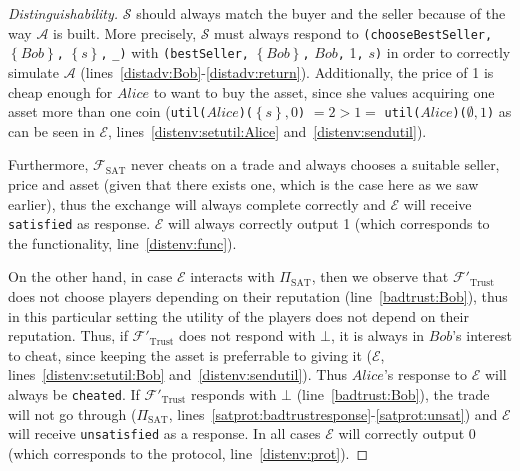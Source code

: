 \begin{proof}[Distinguishability]
    $\mathcal{S}$ should always match the
    buyer and the seller because of the way $\mathcal{A}$ is built. More precisely,
    $\mathcal{S}$ must always respond to \texttt{(chooseBestSeller,}
    $\left\{Bob\right\}$\texttt{,} $\left\{s\right\}$\texttt{,} \texttt{\_)} with
    \texttt{(bestSeller,} $\left\{Bob\right\}$\texttt{,} $Bob$\texttt{,} 1\texttt{,}
    $s$\texttt{)} in order to correctly simulate $\mathcal{A}$
    (lines~\ref{distadv:Bob}-\ref{distadv:return}). Additionally, the price of 1 is cheap
    enough for $Alice$ to want to buy the asset, since she values acquiring one asset more
    than one coin (\texttt{util(}$Alice$\texttt{)(}$\left\{s\right\}, 0$\texttt{)} $= 2 >
    1 = $ \texttt{util(}$Alice$\texttt{)(}$\emptyset, 1$\texttt{)} as can be seen in
    $\mathcal{E}$, lines~\ref{distenv:setutil:Alice} and~\ref{distenv:sendutil}).

    Furthermore, $\mathcal{F}_{\mathrm{SAT}}$ never cheats on a trade and always chooses a
    suitable seller, price and asset (given that there exists one, which is the case here
    as we saw earlier), thus the exchange will always complete correctly and $\mathcal{E}$
    will receive \texttt{satisfied} as response. $\mathcal{E}$ will always correctly
    output 1 (which corresponds to the functionality, line~\ref{distenv:func}).

    On the other hand, in case $\mathcal{E}$ interacts with $\Pi_{\mathrm{SAT}}$, then we
    observe that $\mathcal{F}'_{\mathrm{Trust}}$ does not choose players depending on
    their reputation (line~\ref{badtrust:Bob}), thus in this particular setting the
    utility of the players does not depend on their reputation. Thus, if
    $\mathcal{F}'_{\mathrm{Trust}}$ does not respond with $\bot$, it is always in $Bob$'s
    interest to cheat, since keeping the asset is preferrable to giving it ($\mathcal{E}$,
    lines~\ref{distenv:setutil:Bob} and~\ref{distenv:sendutil}). Thus $Alice$'s response
    to $\mathcal{E}$ will always be \texttt{cheated}. If $\mathcal{F}'_{\mathrm{Trust}}$
    responds with $\bot$ (line~\ref{badtrust:Bob}), the trade will not go through
    ($\Pi_{\mathrm{SAT}}$, lines~\ref{satprot:badtrustresponse}-\ref{satprot:unsat}) and
    $\mathcal{E}$ will receive \texttt{unsatisfied} as a response. In all cases
    $\mathcal{E}$ will correctly output 0 (which corresponds to the protocol,
    line~\ref{distenv:prot}).
  \end{proof}
